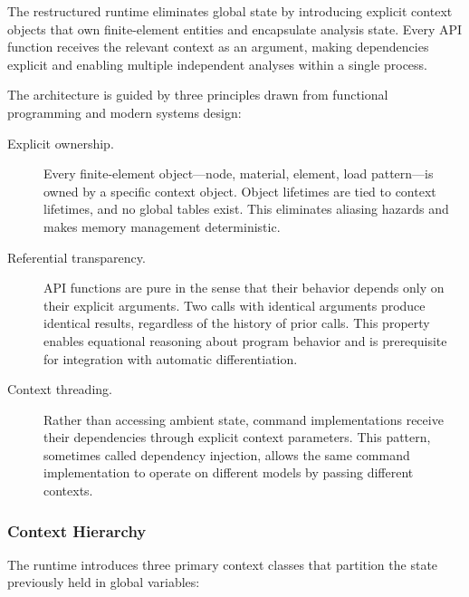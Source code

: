 The restructured runtime eliminates global state by introducing explicit context objects that own finite-element entities and encapsulate analysis state. 
Every API function receives the relevant context as an argument, making dependencies explicit and enabling multiple independent analyses within a single process.

The architecture is guided by three principles drawn from functional programming and modern systems design:

\begin{description}
    \item[Explicit ownership.] Every finite-element object---node, material, element, load pattern---is owned by a specific context object. Object lifetimes are tied to context lifetimes, and no global tables exist. This eliminates aliasing hazards and makes memory management deterministic.

    \item[Referential transparency.] API functions are pure in the sense that their behavior depends only on their explicit arguments. 
    Two calls with identical arguments produce identical results, regardless of the history of prior calls. 
    This property enables equational reasoning about program behavior and is prerequisite for integration with automatic differentiation.

    \item[Context threading.] Rather than accessing ambient state, command implementations receive their dependencies through explicit context parameters. This pattern, sometimes called dependency injection, allows the same command implementation to operate on different models by passing different contexts.
\end{description}

\subsubsection{Context Hierarchy}

The runtime introduces three primary context classes that partition the state previously held in global variables:

